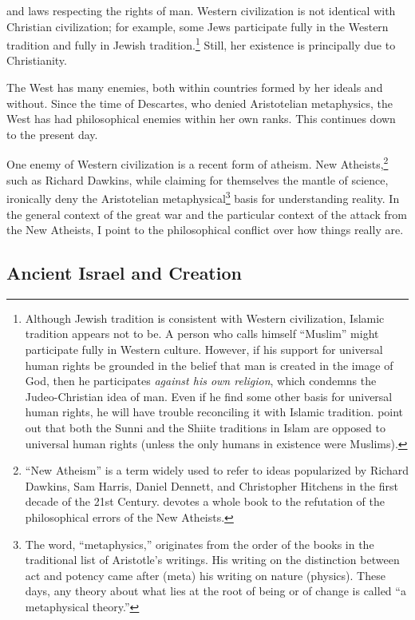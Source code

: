 \documentclass[twocolumn]{article}
\begin{document}
and laws respecting the rights of man.  Western civilization is not identical
with Christian civilization; for example, some Jews participate fully in the
Western tradition and fully in Jewish tradition.\footnote{%
   Although Jewish tradition is consistent with Western civilization, Islamic
   tradition appears not to be.  A person who calls himself ``Muslim'' might
   participate fully in Western culture.  However, if his support for universal
   human rights be grounded in the belief that man is created in the image of
   God, then he participates \emph{against his own religion}, which condemns
   the Judeo-Christian idea of man.  Even if he find some other basis for
   universal human rights, he will have trouble reconciling it with Islamic
   tradition.  \cite{as2003} point out that both the Sunni and the Shiite
   traditions in Islam are opposed to universal human rights (unless the only
   humans in existence were Muslims).
}
Still, her existence is principally due to Christianity.

The West has many enemies, both within countries formed by her ideals and
without.  Since the time of Descartes, who denied Aristotelian metaphysics, the
West has had philosophical enemies within her own ranks.  This continues down
to the present day.

One enemy of Western civilization is a recent form of atheism.  New
Atheists,\footnote{%
   ``New Atheism'' is a term widely used to refer to ideas popularized by
   Richard Dawkins, Sam Harris, Daniel Dennett, and Christopher Hitchens in the
   first decade of the 21st Century.  \cite{f2008} devotes a whole book to the
   refutation of the philosophical errors of the New Atheists.
}
such as Richard Dawkins, while claiming for themselves the mantle of science,
ironically deny the Aristotelian metaphysical\footnote{%
   The word, ``metaphysics,'' originates from the order of the books in the
   traditional list of Aristotle's writings.  His writing on the distinction
   between act and potency came after (meta) his writing on nature (physics).
   These days, any theory about what lies at the root of being or of change is
   called ``a metaphysical theory.''%
}
basis for understanding reality.  In the general context of the great war and
the particular context of the attack from the New Atheists, I point to the
philosophical conflict over how things really are.

\subsection{Ancient Israel and Creation}
\end{document}
